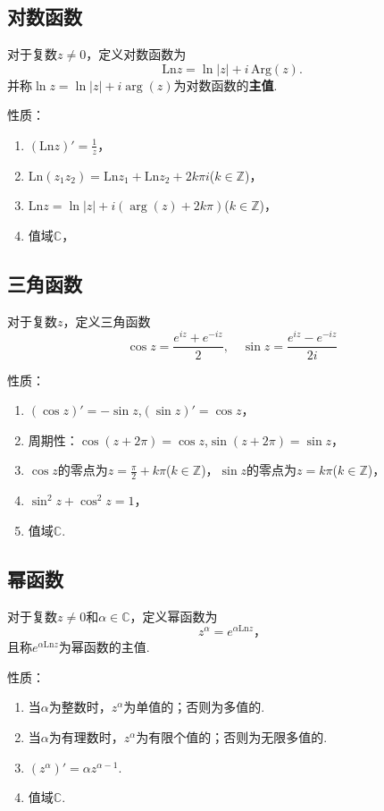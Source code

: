 \documentclass[openany,oneside]{ctexbook}
\begin{document}
\subsection{对数函数}
\begin{definition}
  对于复数$z \neq 0$，定义对数函数为
\[\mathrm{Ln} z = \ln|z| + i\, \mathrm{Arg}(z).\]
并称$\ln z = \ln|z| + i\arg(z)$为对数函数的\textbf{主值}.
\end{definition}
性质：
\begin{enumerate}\setlength{\itemsep}{0.5pt}
    \item $(\mathrm{Ln} z)' = \frac{1}{z}$，
    \item $\mathrm{Ln}(z_1z_2) = \mathrm{Ln} z_1 + \mathrm{Ln} z_2 + 2k\pi i$($k \in \mathbb{Z}$)，
    \item $\mathrm{Ln} z = \ln|z| + i(\arg(z) + 2k\pi)$($k \in \mathbb{Z}$)，
    \item 值域$\mathbb{C}$，
\end{enumerate}
\subsection{三角函数}
\begin{definition}
对于复数$z$，定义三角函数
\[
\cos z = \frac{e^{iz} + e^{-iz}}{2}, \quad \sin z = \frac{e^{iz} - e^{-iz}}{2i}
\]
\end{definition}
性质：
\begin{enumerate}\setlength{\itemsep}{0.5pt}
  \item $(\cos z)' = -\sin z$,$(\sin z)' = \cos z$，
  \item 周期性：$\cos(z + 2\pi) = \cos z$,$\sin(z + 2\pi) = \sin z$，
  \item $\cos z$的零点为$z = \frac{\pi}{2} + k\pi$($k \in \mathbb{Z}$)，$\sin z$的零点为$z = k\pi$($k \in \mathbb{Z}$)，
  \item $\sin ^2 z + \cos^2 z = 1$，
  \item 值域$\mathbb{C}$.
\end{enumerate}

\subsection{幂函数}
\begin{definition}
  对于复数$z\neq 0$和$\alpha\in\mathbb{C}$，定义幂函数为
\[z^\alpha = e^{\alpha \mathrm{Ln} z}，\]
且称$e^{\alpha \mathrm{Ln} z}$为幂函数的主值.
\end{definition}
性质：
\begin{enumerate}\setlength{\itemsep}{0.5pt}
    \item 当$\alpha$为整数时，$z^\alpha$为单值的；否则为多值的.
    \item 当$\alpha$为有理数时，$z^\alpha$为有限个值的；否则为无限多值的.
    \item $(z^\alpha)' = \alpha z^{\alpha - 1}$.
    \item 值域$\mathbb{C}$.
\end{enumerate}
\end{document}

